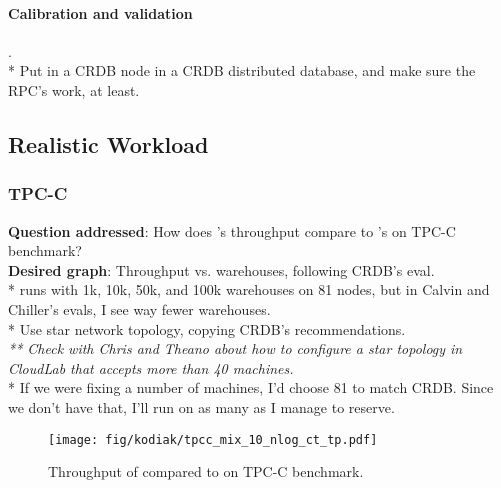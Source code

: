 \paragraph{Calibration and validation}.\\
* Put in a CRDB node in a CRDB distributed database, and make sure the RPC's work, at least.\\

\subsection{Realistic Workload}


\subsubsection{TPC-C}
\label{sec:tpcc}

\textbf{Question addressed}: How does \name{}'s throughput compare to \dsdb{}'s on TPC-C benchmark?\\
\textbf{Desired graph}: Throughput vs. warehouses, following CRDB's eval.\\

* \dsdb{} runs with 1k, 10k, 50k, and 100k warehouses on 81 nodes, but in Calvin and Chiller's evals, I see way fewer warehouses. \\
* Use star network topology, copying CRDB's recommendations.\\
\textit{** Check with Chris and Theano about how to configure a star topology in CloudLab that accepts more than 40 machines.}\\
* If we were fixing a number of machines, I'd choose 81 to match CRDB. Since we don't have that, I'll run on as many as I manage to reserve.

\begin{figure}[t]
  \texttt{[image: fig/kodiak/tpcc\_mix\_10\_nlog\_ct\_tp.pdf]}
  \caption{Throughput of \name{} compared to \dsdb{} on TPC-C benchmark.}
  \label{fig:tpcc_normal}
\end{figure}

